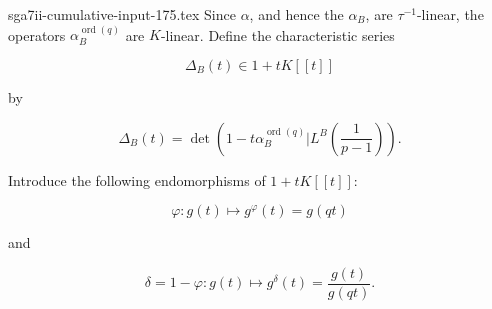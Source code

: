 \begin{filecontents*}{sga7ii-cumulative-input-175.tex}
Since $\alpha$, and hence the $\alpha_B$, are $\tau^{-1}$-linear, the
operators $\alpha_B^{\operatorname{ord}(q)}$ are $K$-linear. Define the
characteristic series

\[
\Delta_B(t)\in1+tK[[t]]
\]

by

\begin{equation}\tag{4.5.28}
\Delta_B(t)=\det\!\left(
1-t\alpha_B^{\operatorname{ord}(q)}
\mathrel{\Big|}L^B\!\left(\frac1{p-1}\right)\right).
\end{equation}

Introduce the following endomorphisms of $1+tK[[t]]$:

\begin{equation}\tag{4.5.29}
\varphi:g(t)\longmapsto g^\varphi(t)=g(qt)
\end{equation}

and

\begin{equation}\tag{4.5.30}
\delta=1-\varphi:g(t)\longmapsto
g^\delta(t)=\frac{g(t)}{g(qt)}.
\end{equation}
\end{filecontents*}

